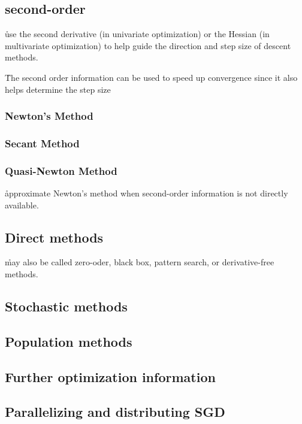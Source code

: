 \subsection{second-order}

\r{use the second derivative (in univariate optimization) or the Hessian (in multivariate optimization) to help guide the direction and step size of descent methods.}

\r{The second order information can be used to speed up convergence since it also helps determine the step size}

\subsubsection{Newton's Method}

\subsubsection{Secant Method}

\subsubsection{Quasi-Newton Method}

\r{approximate Newton's method when second-order information is not directly available.}

\subsection{Direct methods}

\r{may also be called zero-oder, black box, pattern search, or derivative-free methods.}

\subsection{Stochastic methods}

\subsection{Population methods}

\subsection{Further optimization information}


\subsection{Parallelizing and distributing SGD}


